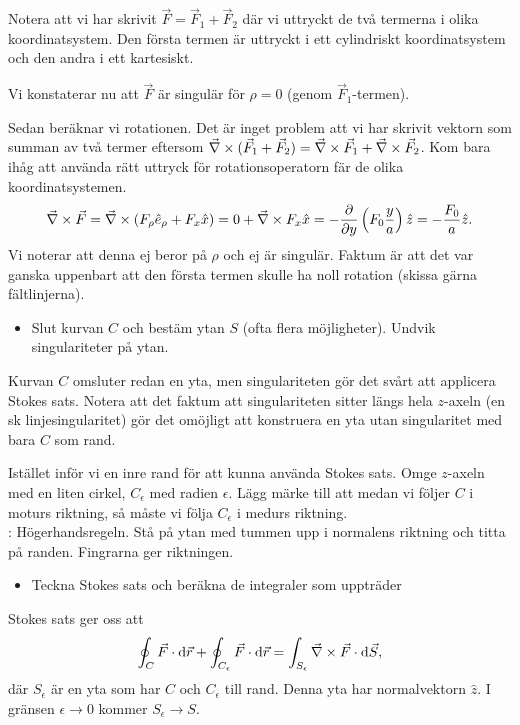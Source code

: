 \documentclass[%
oneside,                 %
final,                   %
10pt]{article}
\newcommand{\longinlinecomment}[3]{{\color{red}{\bf #1}: #2}}
\newenvironment{notice_mdfboxadmon}[1][]{
\begin{notice_mdfboxmdframed}[frametitle=#1]
}
{
\end{notice_mdfboxmdframed}
}
\begin{document}
\begin{notice_mdfboxadmon}
Notera att vi har skrivit $\vec{F} = \vec{F}_1 + \vec{F}_2$ där vi uttryckt de två termerna i olika koordinatsystem. Den första termen är uttryckt i ett cylindriskt koordinatsystem och den andra i ett kartesiskt.

Vi konstaterar nu att $\vec{F}$ är singulär för $\rho = 0$ (genom $\vec{F}_1$-termen).

Sedan beräknar vi rotationen. Det är inget problem att vi har skrivit vektorn som summan av två termer eftersom $\vec{\nabla} \times (\vec{F}_1 + \vec{F}_2) = \vec{\nabla} \times \vec{F}_1 + \vec{\nabla} \times \vec{F}_2$. Kom bara ihåg att använda rätt uttryck för rotationsoperatorn fär de olika koordinatsystemen.
\begin{equation}
  \vec{\nabla} \times \vec{F} = \vec{\nabla} \times \left( F_\rho \hat{e}_\rho + F_x \hat{x} \right) = 0 + \vec{\nabla} \times F_x \hat{x} = - \frac{\partial}{\partial y}\left(F_0\frac{y}{a}\right) 
\hat{z} = - \frac{F_0}{a} \hat{z}.
\end{equation}
Vi noterar att denna ej beror på $\rho$ och ej är singulär. Faktum är att det var ganska uppenbart att den första termen skulle ha noll rotation (skissa gärna fältlinjerna).

\begin{itemize}
\item Slut kurvan $C$ och bestäm ytan $S$ (ofta flera möjligheter). Undvik singulariteter på ytan.
\end{itemize}

\noindent
Kurvan $C$ omsluter redan en yta, men singulariteten gör det svårt att applicera Stokes sats. Notera att det faktum att singulariteten sitter längs hela $z$-axeln (en sk linjesingularitet) gör det omöjligt att konstruera en yta utan singularitet med bara $C$ som rand.

Istället inför vi en inre rand för att kunna använda Stokes sats. Omge $z$-axeln med en liten cirkel, $C_\epsilon$ med radien $\epsilon$. Lägg märke till att medan vi följer $C$ i moturs riktning, så måste  vi följa $C_\epsilon$ i medurs riktning. \\
\longinlinecomment{Kommentar 1}{ Högerhandsregeln. Stå på ytan med tummen upp i normalens riktning och titta på randen. Fingrarna ger riktningen. }{ Högerhandsregeln. Stå på ytan } 
\begin{itemize}
\item Teckna Stokes sats och beräkna de integraler som uppträder
\end{itemize}

\noindent
Stokes sats ger oss att
\begin{equation}
  \oint_C \vec{F}\cdot \mbox{d}\vec{r} + \oint_{C_\epsilon} \vec{F}\cdot \mbox{d}\vec{r}
= \int_{S_\epsilon} \vec{\nabla} \times \vec{F} \cdot \mbox{d}\vec{S},
\end{equation}
där $S_\epsilon$ är en yta som har $C$ och $C_\epsilon$ till rand.  Denna yta har 
normalvektorn $\hat{z}$. I gränsen $\epsilon \to 0$ kommer $S_\epsilon \to S$.


\end{notice_mdfboxadmon}
\end{document}
